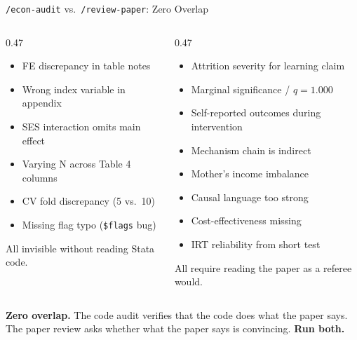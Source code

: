 \documentclass[aspectratio=169, 10pt]{beamer}
\begin{document}
\begin{frame}{\texttt{/econ-audit} vs.\ \texttt{/review-paper}: Zero Overlap}
\vskip-2pt
\begin{columns}[T]
\begin{column}{0.47\textwidth}
\begin{tcolorbox}[keybox, title={\faCode\quad \texttt{/econ-audit} found 6}, top=3pt, bottom=3pt]
\scriptsize
\begin{itemize}\setlength{\itemsep}{1pt}
  \item FE discrepancy in table notes
  \item Wrong index variable in appendix
  \item SES interaction omits main effect
  \item Varying N across Table 4 columns
  \item CV fold discrepancy (5 vs.\ 10)
  \item Missing flag typo (\texttt{\$flags} bug)
\end{itemize}
\vskip2pt
{\tiny\color{CoolGray} All invisible without reading Stata code.}
\end{tcolorbox}
\end{column}
\begin{column}{0.47\textwidth}
\begin{tcolorbox}[colback=LightGold, colframe=UVMGold, boxrule=0.8pt, arc=3pt,
  left=6pt, right=6pt, top=3pt, bottom=3pt,
  fonttitle=\bfseries\small\color{white}, coltitle=white, colbacktitle=UVMGold,
  title={\faFile*[regular]\quad \texttt{/review-paper} found 8}]
\scriptsize
\begin{itemize}\setlength{\itemsep}{1pt}
  \item Attrition severity for learning claim
  \item Marginal significance / $q = 1.000$
  \item Self-reported outcomes during intervention
  \item Mechanism chain is indirect
  \item Mother's income imbalance
  \item Causal language too strong
  \item Cost-effectiveness missing
  \item IRT reliability from short test
\end{itemize}
\vskip2pt
{\tiny\color{CoolGray} All require reading the paper as a referee would.}
\end{tcolorbox}
\end{column}
\end{columns}
\vskip4pt
\begin{tcolorbox}[quotebox, width=13cm, top=2pt, bottom=2pt]
\small \textbf{Zero overlap.} The code audit verifies that the code does what the paper says. The paper review asks whether what the paper says is convincing. \textbf{Run both.}
\end{tcolorbox}
\end{frame}
\end{document}
